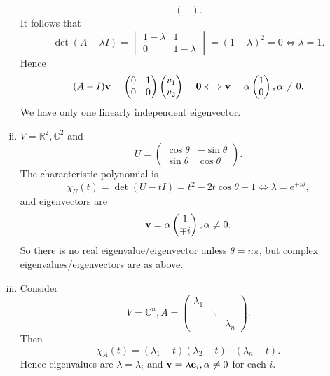 \documentclass[10pt]{article}
\begin{document}
\begin{example}
\begin{enumerate}[(i)]
\[\begin{pmatrix}
                \end{pmatrix}
            .\]
            It follows that 
            \[
                \det (A-\lambda I)=\begin{vmatrix}
                    1-\lambda& 1\\0& 1-\lambda
                \end{vmatrix}=(1-\lambda)^2=0 \Longleftrightarrow \lambda=1
            .\]
            Hence 
            \[
                (A-I){\bf v}=\begin{pmatrix}
                    0&1\\0&0
                \end{pmatrix}\begin{pmatrix}
                    v_1\\v_2
                \end{pmatrix}=\mathbf{0} \Longleftrightarrow {\bf v}=\alpha\begin{pmatrix}
                    1\\0
                \end{pmatrix}, \alpha\neq 0
            .\]
            We have only one linearly independent eigenvector.
            \item $ V=\mathbb{R}^2, \mathbb{C}^{2} $ and 
            \[
                U = \begin{pmatrix}
                    \cos \theta&-\sin \theta\\
                    \sin \theta&\cos \theta
                \end{pmatrix}
            .\]
            The characteristic polynomial is 
            \[
                \chi_U(t)=\det (U-tI)=t^2-2t \cos \theta+1 \Leftrightarrow \lambda=e^{\pm i\theta}
            ,\]
            and eigenvectors are 
            \[
                {\bf v}=\alpha\begin{pmatrix}
                    1\\\mp i
                \end{pmatrix}, \alpha\neq 0
            .\]
            So there is no real eigenvalue/eigenvector unless $ \theta=n\pi $, but complex eigenvalues/eigenvectors are as above.
            \item Consider 
            \[
                V=\mathbb{C}^{n}, A=\begin{pmatrix}
                    \lambda_1&&\\
                    &\ddots&\\
                    &&\lambda_n
                \end{pmatrix}
            .\]
            Then
            \[
                \chi_A(t)=(\lambda_1-t)(\lambda_2-t)\cdots (\lambda_n-t)
            .\]
            Hence eigenvalues are $ \lambda=\lambda_i $ and $ {\bf v}=\lambda{\bf e}_i, \alpha\neq 0 $ for each $i$.
        \end{enumerate}
    \end{example}
\end{document}
